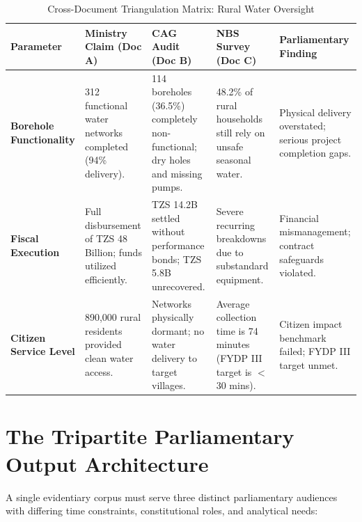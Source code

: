 \documentclass[11pt, a4paper]{report}
\begin{document}
\begin{table}[htbp]
\centering
\caption{Cross-Document Triangulation Matrix: Rural Water Oversight}
\vspace{0.2cm}
\begin{tabular}{@{}>{\bfseries}p{2.6cm}p{2.8cm}p{3.2cm}p{3cm}p{3.4cm}@{}}
\toprule
Parameter & Ministry Claim (Doc A) & CAG Audit (Doc B) & NBS Survey (Doc C) & Parliamentary Finding \\
\midrule
Borehole Functionality & 312 functional water networks completed (94\% delivery). & 114 boreholes (36.5\%) completely non-functional; dry holes and missing pumps. & 48.2\% of rural households still rely on unsafe seasonal water. & Physical delivery overstated; serious project completion gaps. \\
\addlinespace
Fiscal Execution & Full disbursement of TZS 48 Billion; funds utilized efficiently. & TZS 14.2B settled without performance bonds; TZS 5.8B unrecovered. & Severe recurring breakdowns due to substandard equipment. & Financial mismanagement; contract safeguards violated. \\
\addlinespace
Citizen Service Level & 890,000 rural residents provided clean water access. & Networks physically dormant; no water delivery to target villages. & Average collection time is 74 minutes (FYDP III target is $<$30 mins). & Citizen impact benchmark failed; FYDP III target unmet. \\
\bottomrule
\end{tabular}
\end{table}

\newpage

\section{The Tripartite Parliamentary Output Architecture}
A single evidentiary corpus must serve three distinct parliamentary audiences with differing time constraints, constitutional roles, and analytical needs:
\end{document}
